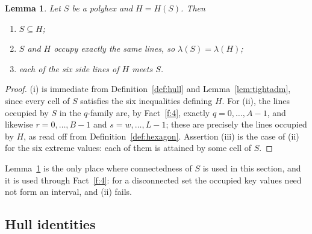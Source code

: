 \documentclass[11pt]{article}
\theoremstyle{plain}
\newtheorem{lemma}[theorem]{Lemma}
\theoremstyle{definition}
\theoremstyle{remark}
\begin{document}
\begin{lemma}\label{lem:hull}
Let \(S\) be a polyhex and \(H=H(S)\). Then
\begin{enumerate}
\item[(i)] \(S\subseteq H\);
\item[(ii)] \(S\) and \(H\) occupy exactly the same lines, so \(\lambda(S)=\lambda(H)\);
\item[(iii)] each of the six side lines of \(H\) meets \(S\).
\end{enumerate}
\end{lemma}

\begin{proof}
(i) is immediate from Definition~\ref{def:hull} and Lemma~\ref{lem:tightadm}, since
every cell of \(S\) satisfies the six inequalities defining \(H\). For (ii), the lines occupied by \(S\) in the \(q\)-family
are, by Fact~\ref{f:4}, exactly \(q=0,\dots,A-1\), and likewise \(r=0,\dots,B-1\) and
\(s=w,\dots,L-1\); these are precisely the lines occupied by \(H\), as read off from
Definition~\ref{def:hexagon}. Assertion (iii) is the case of (ii) for the six extreme
values: each of them is attained by some cell of \(S\).
\end{proof}

Lemma~\ref{lem:hull} is the only place where connectedness of \(S\) is used in this
section, and it is used through Fact~\ref{f:4}: for a disconnected set the occupied key
values need not form an interval, and (ii) fails.

\subsection{Hull identities}\label{sec:2.5}
\end{document}
